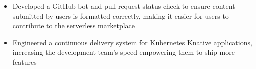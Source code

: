\documentclass[10pt]{article}
\begin{document}
\begin{flushleft}
\begin{itemize}
    	\item Developed a GitHub bot and pull request status check to ensure content submitted by users is formatted correctly, making it easier for users to contribute to the serverless marketplace
        
		\item Engineered a continuous delivery system for Kubernetes Knative applications, increasing the development team's speed empowering them to ship more features
	\end{itemize}







\end{flushleft}
\end{document}
